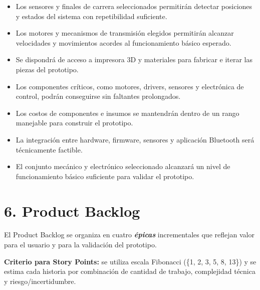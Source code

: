 ﻿\documentclass[
11pt, %
]{charter}
\begin{document}
\begin{itemize}
	\item Los sensores y finales de carrera seleccionados permitirán detectar posiciones y estados del sistema con repetibilidad suficiente.
	\item Los motores y mecanismos de transmisión elegidos permitirán alcanzar velocidades y movimientos acordes al funcionamiento básico esperado.
	\item Se dispondrá de acceso a impresora 3D y materiales para fabricar e iterar las piezas del prototipo.
	\item Los componentes críticos, como motores, drivers, sensores y electrónica de control, podrán conseguirse sin faltantes prolongados.
	\item Los costos de componentes e insumos se mantendrán dentro de un rango manejable para construir el prototipo.
	\item La integración entre hardware, firmware, sensores y aplicación Bluetooth será técnicamente factible.
	\item El conjunto mecánico y electrónico seleccionado alcanzará un nivel de funcionamiento básico suficiente para validar el prototipo.
\end{itemize}

\section{6. Product Backlog}
\label{sec:backlog}

El Product Backlog se organiza en cuatro \textbf{\textit{\'{e}picas}} incrementales que reflejan valor para el usuario y para la validación del prototipo.

\textbf{Criterio para Story Points:} se utiliza escala Fibonacci (\{1, 2, 3, 5, 8, 13\}) y se estima cada historia por combinación de cantidad de trabajo, complejidad técnica y riesgo/incertidumbre.
\end{document}
